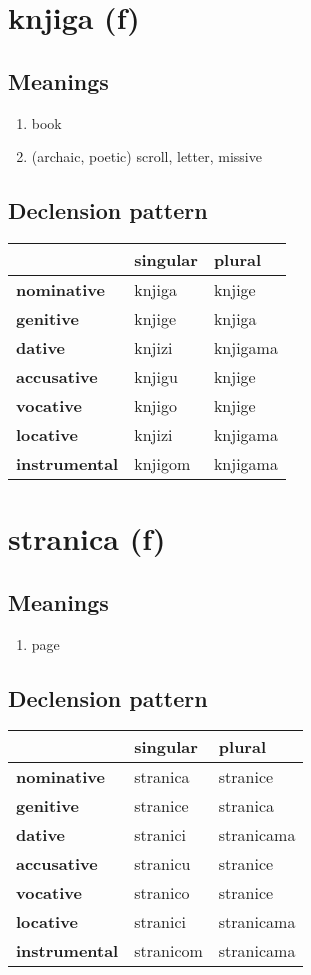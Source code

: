 \filbreak
\section{knjiga (f)}
\subsection*{Meanings}
\begin{enumerate}
\item book
\item (archaic, poetic) scroll, letter, missive
\end{enumerate}
\subsection*{Declension pattern}
\begin{tabularx}{\linewidth}{Xll}
\toprule
{} & singular &    plural \\
\midrule
\textbf{nominative  } &   knjiga &    knjige \\
\textbf{genitive    } &   knjige &    knjiga \\
\textbf{dative      } &   knjizi &  knjigama \\
\textbf{accusative  } &   knjigu &    knjige \\
\textbf{vocative    } &   knjigo &    knjige \\
\textbf{locative    } &   knjizi &  knjigama \\
\textbf{instrumental} &  knjigom &  knjigama \\
\bottomrule
\end{tabularx}

\filbreak
\section{stranica (f)}
\subsection*{Meanings}
\begin{enumerate}
\item page
\end{enumerate}
\subsection*{Declension pattern}
\begin{tabularx}{\linewidth}{Xll}
\toprule
{} &   singular &      plural \\
\midrule
\textbf{nominative  } &   stranica &    stranice \\
\textbf{genitive    } &   stranice &    stranica \\
\textbf{dative      } &   stranici &  stranicama \\
\textbf{accusative  } &   stranicu &    stranice \\
\textbf{vocative    } &   stranico &    stranice \\
\textbf{locative    } &   stranici &  stranicama \\
\textbf{instrumental} &  stranicom &  stranicama \\
\bottomrule
\end{tabularx}

